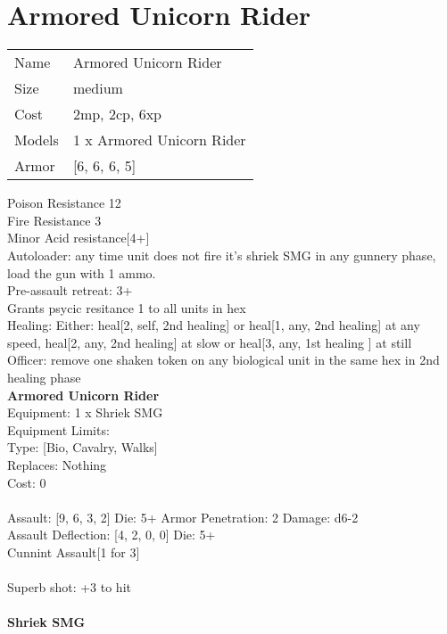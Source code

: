 \pagebreak\pagebreak

\section{ Armored Unicorn Rider }

\begin{tabular}{ll}
  Name & Armored Unicorn Rider \\
  Size & medium\\
  Cost & 2mp, 2cp, 6xp\\
  Models & 1 x Armored Unicorn Rider\\
  Armor & [6, 6, 6, 5]\\
\end{tabular}

\noindent Poison Resistance 12\\ 
Fire Resistance 3\\ 
Minor Acid resistance[4+]\\ 
Autoloader: any time unit does not fire it's shriek SMG in any gunnery phase, load the gun with 1 ammo.\\ 
Pre-assault retreat: 3+\\ 
Grants psycic resitance 1 to all units in hex\\ 
Healing: Either: heal[2, self, 2nd healing] or heal[1, any, 2nd healing] at any speed, heal[2, any, 2nd healing] at slow or heal[3, any, 1st healing ] at still\\ 
Officer: remove one shaken token on any biological unit in the same hex in 2nd healing  phase\\ 


{\bf Armored Unicorn Rider } \\
Equipment: 1 x Shriek SMG \\
Equipment Limits:  \\
Type: [Bio, Cavalry, Walks] \\
Replaces: Nothing \\
Cost: 0\\
\ \\
Assault: [9, 6, 3, 2] Die: 5+ Armor Penetration: 2 Damage: d6-2 \\
Assault Deflection: [4, 2, 0, 0] Die: 5+\\
\indent Cunnint Assault[1 for 3]\\ 
 
\ \\
Superb shot: +3 to hit\\ 

\ \\
{\bf Shriek SMG } \\



